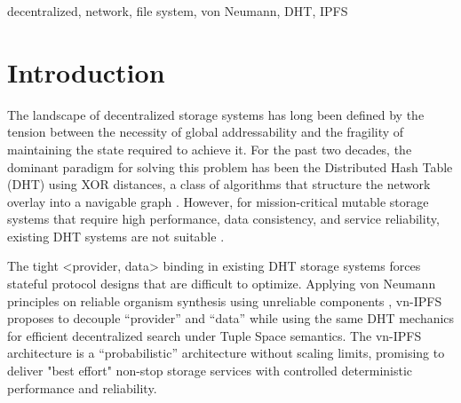 \documentclass[conference]{IEEEtran}
\begin{document}
\begin{IEEEkeywords}
decentralized, network, file system, von Neumann, DHT, IPFS
\end{IEEEkeywords}

\section{Introduction}
The landscape of decentralized storage systems has long been defined by the tension between the necessity of global addressability and the fragility of maintaining the state required to achieve it. For the past two decades, the dominant paradigm for solving this problem has been the Distributed Hash Table (DHT) using XOR distances, a class of algorithms that structure the network overlay into a navigable graph \cite{b1}. However, for mission-critical mutable storage systems that require high performance, data consistency, and service reliability, existing DHT systems are not suitable \cite{b2}.

The tight \textless{}provider, data\textgreater{} binding in existing DHT storage systems forces stateful protocol designs that are difficult to optimize. Applying von Neumann principles on reliable organism synthesis using unreliable components \cite{b3}, vn-IPFS proposes to decouple “provider” and “data” while using the same DHT mechanics for efficient decentralized search under Tuple Space semantics. The vn-IPFS architecture is a “probabilistic” architecture without scaling limits, promising to deliver "best effort" non-stop storage services with controlled deterministic performance and reliability.
\end{document}
